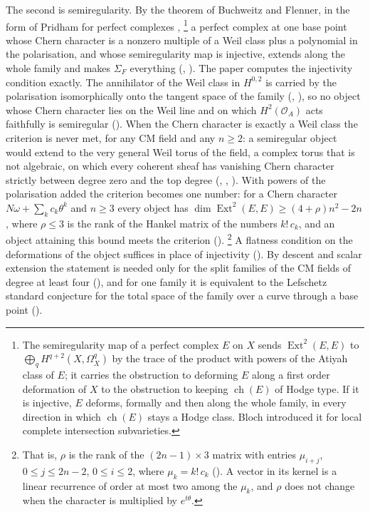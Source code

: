 \documentclass[11pt,reqno]{amsart}
\theoremstyle{plain}
\theoremstyle{definition}
\theoremstyle{remark}
\newcommand{\cO}{\mathcal{O}}
\DeclareMathOperator{\ch}{ch}
\DeclareMathOperator{\Ext}{Ext}
\begin{document}
The second is semiregularity. By the theorem of Buchweitz and Flenner, in the
form of Pridham for perfect complexes \cite{BF03,Pri24},%
\footnote{The semiregularity map of a perfect complex $E$ on $X$ sends
$\Ext^{2}(E,E)$ to $\bigoplus_{q}H^{q+2}(X,\Omega^{q}_{X})$ by the trace of
the product with powers of the Atiyah class of $E$; it carries the
obstruction to deforming $E$ along a first order deformation of $X$ to the
obstruction to keeping $\ch(E)$ of Hodge type. If it is injective, $E$
deforms, formally and then along the whole family, in every direction in
which $\ch(E)$ stays a Hodge class. Bloch introduced it for local complete
intersection subvarieties.}
a perfect complex at
one base point whose Chern character is a nonzero multiple of a Weil class
plus a polynomial in the polarisation, and whose semiregularity map is
injective, extends along the whole family and makes $\Sigma_{F}$ everything
(, \cite[Theorem~17.7(v)]{paperI}). The paper computes
the injectivity condition exactly. The annihilator of the Weil class in
$H^{0,2}$ is carried by the polarisation isomorphically onto the tangent space
of the family (\cite[Lemma~9.6]{paperI}, \cite[Theorem~9.17]{paperI}), so no object
whose Chern character lies on the Weil line and on which $H^{2}(\cO_{A})$ acts
faithfully is semiregular (\cite[Theorem~9.7]{paperI}). When the Chern character is
exactly a Weil class the criterion is never met, for any CM field and any
$n\ge2$: a semiregular object would extend to the very general Weil torus of
the field, a complex torus that is not algebraic, on which every coherent
sheaf has vanishing Chern character strictly between degree zero and the top
degree (, ,
). With powers of the polarisation added the criterion
becomes one number: for a Chern character $N\omega+\sum_{k}c_{k}\theta^{k}$
and $n\ge3$ every object has $\dim\Ext^{2}(E,E)\ge(4+\rho)n^{2}-2n$, where
$\rho\le3$ is the rank of the Hankel matrix of the numbers $k!\,c_{k}$, and
an object attaining this bound meets the criterion
().%
\footnote{That is, $\rho$ is the rank of the $(2n-1)\times3$ matrix with
entries $\mu_{i+j}$, $0\le j\le2n-2$, $0\le i\le2$, where $\mu_{k}=k!\,c_{k}$
(). A vector in its kernel is a linear recurrence of order
at most two among the $\mu_{k}$, and $\rho$ does not change when the character
is multiplied by $e^{t\theta}$.}
A flatness condition on the deformations of the object suffices in place of
injectivity (). By descent and scalar extension the
statement is needed only for the split families of the CM fields of degree at
least four (\cite[Proposition~2.13]{paperIII}), and for one family it is equivalent to the
Lefschetz standard conjecture for the total space of the family over a curve
through a base point (\cite[Corollary~2.31]{paperIII}).
\end{document}
